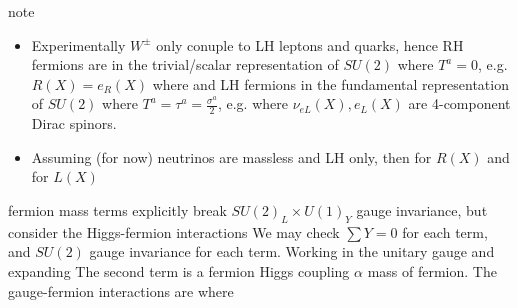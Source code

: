 \documentclass{article}
\begin{document}
note
\begin{itemize}
    \item Experimentally $W^\pm$ only conuple to LH leptons and quarks, hence RH fermions are in the trivial/scalar representation of $SU(2)$ where $T^a=0$, e.g. $R(X) = e_R(X)$ where 
    and LH fermions in the fundamental representation of $SU(2)$ where $T^a = \tau^a = \frac{\sigma^a}{2}$, e.g.
    where $\nu_{eL}(X), e_L(X)$ are 4-component Dirac spinors. 
    \item Assuming (for now) neutrinos are massless and LH only, then for $R(X)$
    and for $L(X)$ 
\end{itemize}
fermion mass terms explicitly break $SU(2)_L \times U(1)_Y$ gauge invariance, but consider the Higgs-fermion interactions 
We may check $\sum Y = 0$ for each term, and $SU(2)$ gauge invariance for each term. Working in the unitary gauge and expanding 
The second term is a fermion Higgs coupling $\alpha$ mass of fermion. The gauge-fermion interactions are 
where 
\end{document}
